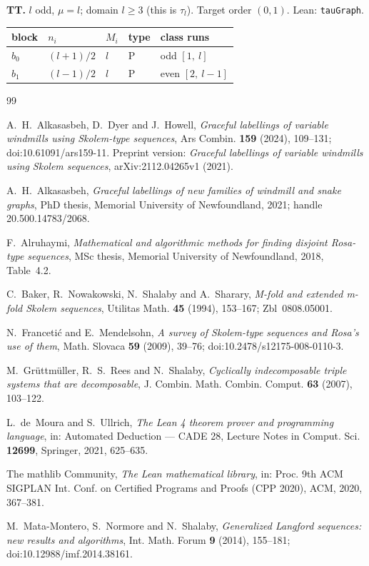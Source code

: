 \documentclass[11pt]{amsart}
\makeatletter
\theoremstyle{plain}
\theoremstyle{definition}
\theoremstyle{remark}
\newcommand{\famtable}[8]{%
  \par\bigskip\noindent\textbf{#1.} #2; domain #4.
  Target order $(#3)$. Lean: #5.\par\nopagebreak\smallskip
  {\footnotesize\noindent
  \begin{tabular}{@{}l l l l >{\raggedright\arraybackslash}p{2.45in}@{}}
  \toprule
  block & $n_i$ & $M_i$ & type & class runs\\
  \midrule
  #6
  \bottomrule
  \end{tabular}\par}
  \nopagebreak\smallskip\noindent{\small Odd chain: #7. Even chain: #8.}\par}
\makeatother
\begin{document}
\famtable{TT}{$l$ odd, $\mu = l$}{0,1}{$l \ge 3$ (this is $\tau_l$)}{\texttt{tauGraph}}{
$b_{0}$ & $(l+1)/2$ & $l$ & P & odd $[1,\ l]$ \\
$b_{1}$ & $(l-1)/2$ & $l$ & P & even $[2,\ l-1]$ \\
}{$b_{0}$}{$b_{1}$}


\begin{thebibliography}{99}

A.~H.~Alkasasbeh, D.~Dyer and J.~Howell,
\emph{Graceful labellings of variable windmills using Skolem-type sequences},
Ars Combin. \textbf{159} (2024), 109--131; doi:10.61091/ars159-11.
Preprint version: \emph{Graceful labellings of variable windmills using Skolem
sequences}, arXiv:2112.04265v1 (2021).

A.~H.~Alkasasbeh,
\emph{Graceful labellings of new families of windmill and snake graphs},
PhD thesis, Memorial University of Newfoundland, 2021; handle 20.500.14783/2068.

F.~Alruhaymi,
\emph{Mathematical and algorithmic methods for finding disjoint Rosa-type sequences},
MSc thesis, Memorial University of Newfoundland, 2018, Table~4.2.

C.~Baker, R.~Nowakowski, N.~Shalaby and A.~Sharary,
\emph{M-fold and extended m-fold Skolem sequences},
Utilitas Math. \textbf{45} (1994), 153--167; Zbl~0808.05001.

N.~Franceti\'c and E.~Mendelsohn,
\emph{A survey of Skolem-type sequences and Rosa's use of them},
Math. Slovaca \textbf{59} (2009), 39--76; doi:10.2478/s12175-008-0110-3.

M.~Gr\"uttm\"uller, R.~S.~Rees and N.~Shalaby,
\emph{Cyclically indecomposable triple systems that are decomposable},
J. Combin. Math. Combin. Comput. \textbf{63} (2007), 103--122.

L.~de~Moura and S.~Ullrich,
\emph{The Lean 4 theorem prover and programming language},
in: Automated Deduction --- CADE 28, Lecture Notes in Comput. Sci.
\textbf{12699}, Springer, 2021, 625--635.

The mathlib Community,
\emph{The Lean mathematical library},
in: Proc. 9th ACM SIGPLAN Int. Conf. on Certified Programs and Proofs
(CPP 2020), ACM, 2020, 367--381.

M.~Mata-Montero, S.~Normore and N.~Shalaby,
\emph{Generalized Langford sequences: new results and algorithms},
Int. Math. Forum \textbf{9} (2014), 155--181; doi:10.12988/imf.2014.38161.


\end{thebibliography}
\end{document}
